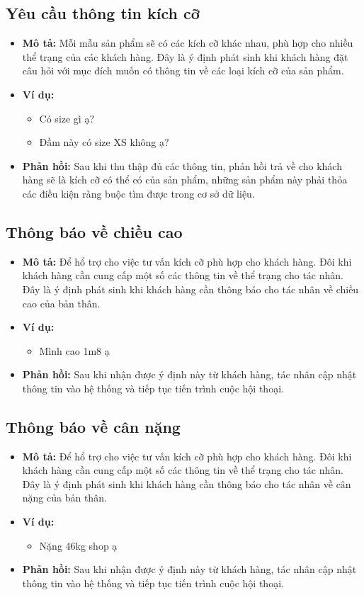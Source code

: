 \subsection{Yêu cầu thông tin kích cỡ}
\begin{itemize}
    \item \textbf{Mô tả:} Mỗi mẫu sản phẩm sẽ có các kích cỡ khác nhau, phù hợp cho nhiều thể trạng của các khách hàng. Đây là ý định phát sinh khi khách hàng đặt câu hỏi với mục đích muốn có thông tin về các loại kích cỡ của sản phẩm.
    \item \textbf{Ví dụ:}
    \begin{itemize}
        \item Có size gì ạ?
        \item Đầm này có size XS không ạ?
    \end{itemize}
    \item \textbf{Phản hồi:} Sau khi thu thập đủ các thông tin, phản hồi trả về cho khách hàng sẽ là kích cỡ có thể có của sản phẩm, những sản phẩm này phải thỏa các điều kiện ràng buộc tìm được trong cơ sở dữ liệu.
\end{itemize}

\subsection{Thông báo về chiều cao}
\begin{itemize}
    \item \textbf{Mô tả:} Để hổ trợ cho việc tư vấn kích cỡ phù hợp cho khách hàng. Đôi khi khách hàng cần cung cấp một số các thông tin về thể trạng cho tác nhân. Đây là ý định phát sinh khi khách hàng cần thông báo cho tác nhân về chiều cao của bản thân.
    \item \textbf{Ví dụ:}
    \begin{itemize}
        \item Mình cao 1m8 ạ
    \end{itemize}
    \item \textbf{Phản hồi:} Sau khi nhận được ý định này từ khách hàng, tác nhân cập nhật thông tin vào hệ thống và tiếp tục tiến trình cuộc hội thoại.
\end{itemize}

\subsection{Thông báo về cân nặng}
\begin{itemize}
    \item \textbf{Mô tả:} Để hổ trợ cho việc tư vấn kích cỡ phù hợp cho khách hàng. Đôi khi khách hàng cần cung cấp một số các thông tin về thể trạng cho tác nhân. Đây là ý định phát sinh khi khách hàng cần thông báo cho tác nhân về cân nặng của bản thân.
    \item \textbf{Ví dụ:}
    \begin{itemize}
        \item Nặng 46kg shop ạ
    \end{itemize}
    \item \textbf{Phản hồi:} Sau khi nhận được ý định này từ khách hàng, tác nhân cập nhật thông tin vào hệ thống và tiếp tục tiến trình cuộc hội thoại.
\end{itemize}

